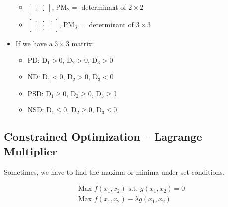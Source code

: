 \begin{itemize}
\begin{itemize}
        \item $\begin{bmatrix}
            . & . \\
            . & .
        \end{bmatrix}$, PM$_2 = $ determinant of $2 \times 2$
        \item $\begin{bmatrix}
            . & . & .\\
            . & . & . \\
            . & . & .
        \end{bmatrix}$, PM$_3 = $ determinant of $3 \times 3$
    \end{itemize}
    \item If we have a $3 \times 3$ matrix:
    \begin{itemize}
        \item PD: D$_1 > 0$, D$_2 > 0$, D$_3 > 0$
        \item ND: D$_1 < 0$, D$_2 > 0$, D$_3 < 0$
        \item PSD: D$_1 \geq 0$, D$_2 \geq 0$, D$_3 \geq 0$
        \item NSD: D$_1 \leq 0$, D$_2 \geq 0$, D$_3 \leq 0$
    \end{itemize}
\end{itemize}


\subsection{Constrained Optimization -- Lagrange Multiplier}

Sometimes, we have to find the maxima or minima under set conditions. 

\begin{align*}
    & \text{Max } f(x_1, x_2) \text{ s.t. } g(x_1, x_2) = 0 \\
    & \text{Max } f(x_1, x_2) - \lambda g(x_1, x_2)
\end{align*}

